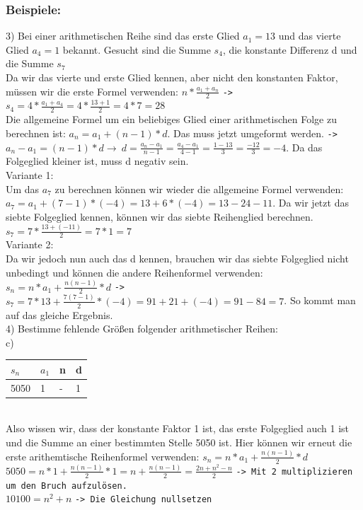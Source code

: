 \documentclass{article}
\begin{document}
	\subsubsection{Beispiele:}
	3) Bei einer arithmetischen Reihe sind das erste Glied $a_1=13$ und das vierte Glied $a_4=1$ bekannt. Gesucht sind die Summe $s_4$, die konstante Differenz d und die Summe $s_7$ \\
	Da wir das vierte und erste Glied kennen, aber nicht den konstanten Faktor, müssen wir die erste Formel verwenden: $n*\frac{a_1+a_n}{2}$ \verb|->| $s_4=4*\frac{a_1+a_4}{2}=4*\frac{13+1}{2}=4*7=28$ \\
	Die allgemeine Formel um ein beliebiges Glied einer arithmetischen Folge zu berechnen ist: $a_n=a_1+(n-1)*d$. Das muss jetzt umgeformt werden. \verb|->| $a_n-a_1=(n-1)*d\to\ d=\frac{a_n-a_1}{n-1}=\frac{a_4-a_1}{4-1}=\frac{1-13}{3}=\frac{-12}{3}=-4$. Da das Folgeglied kleiner ist, muss d negativ sein. \\
	Variante 1:\\
	Um das $a_7$ zu berechnen können wir wieder die allgemeine Formel verwenden: $a_7=a_1+(7-1)*(-4)=13+6*(-4)=13-24-11$. Da wir jetzt das siebte Folgeglied kennen, können wir das siebte Reihenglied berechnen. $s_7=7*\frac{13+(-11)}{2}=7*1=7$ \\
	Variante 2: \\
	Da wir jedoch nun auch das d kennen, brauchen wir das siebte Folgeglied nicht unbedingt und können die andere Reihenformel verwenden: $s_n=n*a_1+\frac{n(n-1)}{2}*d$ \verb|->| $s_7=7*13+\frac{7(7-1)}{2}*(-4)=91+21+(-4)=91-84=7$. So kommt man auf das gleiche Ergebnis. \\
	4) Bestimme fehlende Größen folgender arithmetischer Reihen: \\
	c) \begin{tabular}{| l | l | l | l |}
		\toprule
		$s_n$ & $a_1$ & n & d \\ \midrule
		5050 & 1 & - & 1 \\
		\bottomrule
	\end{tabular} \\
	Also wissen wir, dass der konstante Faktor 1 ist, das erste Folgeglied auch 1 ist und die Summe an einer bestimmten Stelle 5050 ist. Hier können wir erneut die erste arithemtische Reihenformel verwenden: $s_n=n*a_1+\frac{n(n-1)}{2}*d$ \\
	$5050 = n*1+\frac{n(n-1)}{2}*1=n+\frac{n(n-1)}{2}=\frac{2n+n^2-n}{2}$ \verb|-> Mit 2 multiplizieren um den Bruch aufzulösen.| \\
	$10100 = n^2+n$ \verb|-> Die Gleichung nullsetzen| \\
\end{document}
